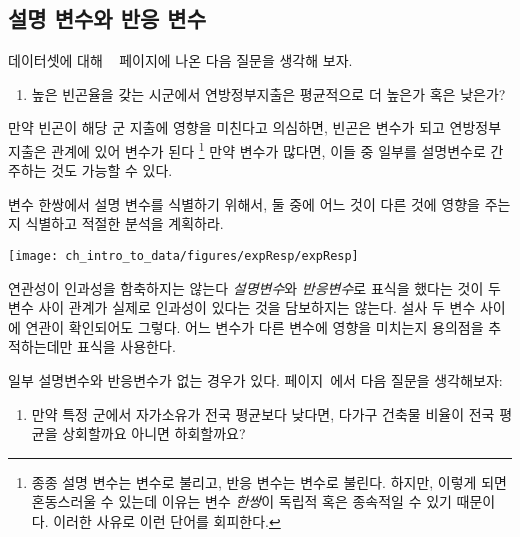 
\subsection{설명 변수와 반응 변수}
\label{explanatoryAndResponse}


 데이터셋에 대해 ~\pageref{fedSpendingPovertyQuestion} 페이지에 나온 다음 질문을 생각해 보자.

\begin{enumerate}
\item[(1)] 
	높은 빈곤율을 갖는 시군에서 연방정부지출은 평균적으로 더 높은가 혹은 낮은가?
\end{enumerate}

만약 빈곤이 해당 군 지출에 영향을 미친다고 의심하면, 빈곤은  변수가 되고 연방정부지출은 관계에 있어  변수가 된다 \footnote{
종종 설명 변수는  변수로 불리고, 반응 변수는  변수로 불린다.
하지만, 이렇게 되면 혼동스러울 수 있는데 이유는 변수 \emph{한쌍}이 독립적 혹은 종속적일 수 있기 때문이다. 이러한 사유로 이런 단어를 회피한다.} 
만약 변수가 많다면, 이들 중 일부를 설명변수로 간주하는 것도 가능할 수 있다.

\begin{tipBox}{

변수 한쌍에서 설명 변수를 식별하기 위해서, 둘 중에 어느 것이 다른 것에 영향을 주는지 식별하고 적절한 분석을 계획하라.

\hspace{10mm}\texttt{[image: ch\_intro\_to\_data/figures/expResp/expResp]}}
\end{tipBox}

\begin{caution}{연관성이 인과성을 함축하지는 않는다}{
\emph{설명변수}와 \emph{반응변수}로 표식을 했다는 것이 두 변수 사이 관계가 실제로 인과성이 있다는 것을 담보하지는 않는다. 설사 두 변수 사이에 연관이 확인되어도 그렇다. 어느 변수가 다른 변수에 영향을 미치는지 용의점을 추적하는데만 표식을 사용한다.}
\end{caution}

일부 설명변수와 반응변수가 없는 경우가 있다. 페이지~\pageref{ownershipMultiUnitQuestion}에서 다음 질문을 생각해보자:

\begin{enumerate}
\item[(2)]
    만약 특정 군에서 자가소유가 전국 평균보다 낮다면, 다가구 건축물 비율이 전국 평균을 상회할까요 아니면 하회할까요?
\end{enumerate}

